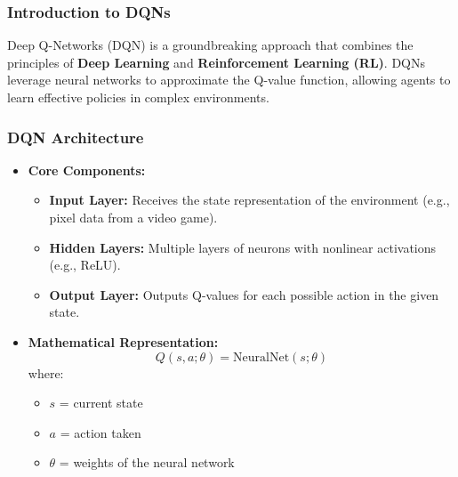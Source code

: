 \documentclass[aspectratio=169]{beamer}
\begin{document}
\begin{frame}[fragile]
  \frametitle{Introduction to DQNs}
  
  Deep Q-Networks (DQN) is a groundbreaking approach that combines the principles of 
  \textbf{Deep Learning} and \textbf{Reinforcement Learning (RL)}. 
  DQNs leverage neural networks to approximate the Q-value function, allowing agents to learn 
  effective policies in complex environments.
\end{frame}

\begin{frame}[fragile]
  \frametitle{DQN Architecture}
  
  \begin{itemize}
    \item \textbf{Core Components:}
      \begin{itemize}
        \item \textbf{Input Layer:} Receives the state representation of the environment (e.g., pixel data from a video game).
        \item \textbf{Hidden Layers:} Multiple layers of neurons with nonlinear activations (e.g., ReLU).
        \item \textbf{Output Layer:} Outputs Q-values for each possible action in the given state.
      \end{itemize}
    
    \item \textbf{Mathematical Representation:}
      \begin{equation}
        Q(s, a; \theta) = \text{NeuralNet}(s; \theta)
      \end{equation}
      where:
      \begin{itemize}
        \item $s$ = current state
        \item $a$ = action taken
        \item $\theta$ = weights of the neural network
      \end{itemize}
  \end{itemize}
\end{frame}
\end{document}
